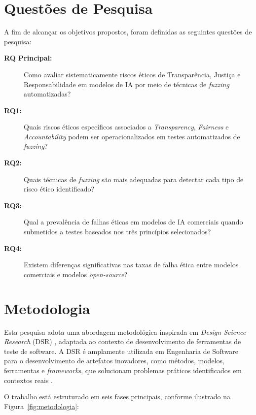 \section{Questões de Pesquisa}

A fim de alcançar os objetivos propostos, foram definidas as seguintes questões de pesquisa:

\begin{description}
    \item[\textbf{RQ Principal:}] Como avaliar sistematicamente riscos éticos de Transparência, Justiça e Responsabilidade em modelos de IA por meio de técnicas de \textit{fuzzing} automatizadas?
    
    \item[\textbf{RQ1:}] Quais riscos éticos específicos associados a \textit{Transparency}, \textit{Fairness} e \textit{Accountability} podem ser operacionalizados em testes automatizados de \textit{fuzzing}?
    
    \item[\textbf{RQ2:}] Quais técnicas de \textit{fuzzing} são mais adequadas para detectar cada tipo de risco ético identificado?
    
    \item[\textbf{RQ3:}] Qual a prevalência de falhas éticas em modelos de IA comerciais quando submetidos a testes baseados nos três princípios selecionados?
    
    \item[\textbf{RQ4:}] Existem diferenças significativas nas taxas de falha ética entre modelos comerciais e modelos \textit{open-source}?
\end{description}

\section{Metodologia}

Esta pesquisa adota uma abordagem metodológica inspirada em \textit{Design Science Research} (DSR) \cite{Hevner2004, Wieringa2014}, adaptada ao contexto de desenvolvimento de ferramentas de teste de software. A DSR é amplamente utilizada em Engenharia de Software para o desenvolvimento de artefatos inovadores, como métodos, modelos, ferramentas e \textit{frameworks}, que solucionam problemas práticos identificados em contextos reais \cite{Peffers2007}.

O trabalho está estruturado em seis fases principais, conforme ilustrado na Figura~\ref{fig:metodologia}:

